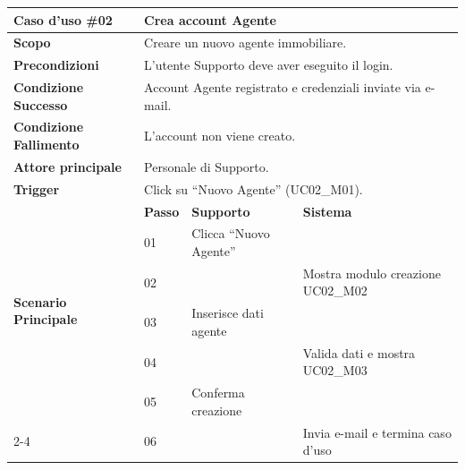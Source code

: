 \documentclass[a4paper,11pt]{article}
\renewcommand{\arraystretch}{1.18}
\begin{document}
\begin{table}[H]
\centering
\renewcommand{\arraystretch}{1.5}
\begin{tabular}{|p{3cm}|l|p{4.5cm}|p{4.5cm}|}
\hline
\rowcolor[HTML]{010066} 
{\color[HTML]{EFEFEF} \textbf{Caso d'uso \#02}} & \multicolumn{3}{l|}{\color[HTML]{FFFFFF} \textbf{Crea account Agente}} \\ \hline

\textbf{Scopo} & \multicolumn{3}{l|}{Creare un nuovo agente immobiliare.} \\ \hline

\textbf{Precondizioni} & \multicolumn{3}{l|}{L'utente Supporto deve aver eseguito il login.} \\ \hline

\textbf{Condizione Successo} & \multicolumn{3}{l|}{Account Agente registrato e credenziali inviate via e-mail.} \\ \hline

\textbf{Condizione Fallimento} & \multicolumn{3}{l|}{L'account non viene creato.} \\ \hline

\textbf{Attore principale} & \multicolumn{3}{l|}{Personale di Supporto.} \\ \hline

\textbf{Trigger} & \multicolumn{3}{l|}{Click su ``Nuovo Agente'' (UC02\_M01).} \\ \hline

\hline
\multirow{6}{3cm}{\textbf{Scenario Principale}} 
   & \textbf{Passo} & \textbf{Supporto} & \textbf{Sistema} \\ \cline{2-4}
   & 01 & Clicca ``Nuovo Agente'' & \\ \cline{2-4}
   & 02 & & Mostra modulo creazione UC02\_M02 \\ \cline{2-4}
   & 03 & Inserisce dati agente & \\ \cline{2-4}
   & 04 & & Valida dati e mostra UC02\_M03 \\ \cline{2-4}
   & 05 & Conferma creazione & \\ \cline{2-4}
   & 06 & & Invia e-mail e termina caso d'uso \\ \hline


\end{tabular}
\end{table}
\end{document}
